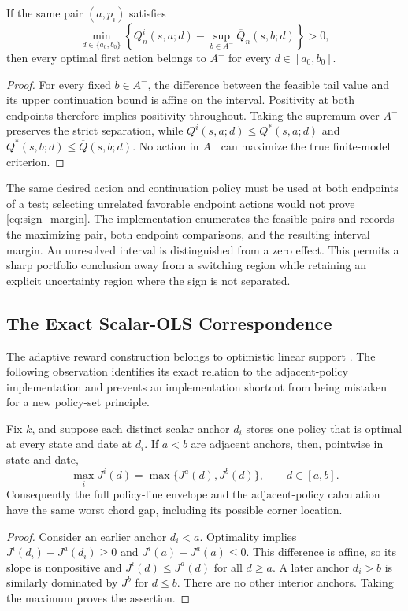 \begin{proposition}
\label{thm:sign}
If the same pair $(a,p_i)$ satisfies
\begin{equation}
 \min_{d\in\{a_0,b_0\}}
 \left\{Q^i_n(s,a;d)-\sup_{b\in A^-}\overline Q_n(s,b;d)\right\}>0,
 \label{eq:sign_margin}
\end{equation}
then every optimal first action belongs to $A^+$ for every $d\in[a_0,b_0]$.
\end{proposition}

\begin{proof}
For every fixed $b\in A^-$, the difference between the feasible tail value and its upper continuation bound is affine on the interval. Positivity at both endpoints therefore implies positivity throughout. Taking the supremum over $A^-$ preserves the strict separation, while $Q^i(s,a;d)\leq Q^*(s,a;d)$ and $Q^*(s,b;d)\leq\overline Q(s,b;d)$. No action in $A^-$ can maximize the true finite-model criterion.
\end{proof}

The same desired action and continuation policy must be used at both endpoints of a test; selecting unrelated favorable endpoint actions would not prove \eqref{eq:sign_margin}. The implementation enumerates the feasible pairs and records the maximizing pair, both endpoint comparisons, and the resulting interval margin. An unresolved interval is distinguished from a zero effect. This permits a sharp portfolio conclusion away from a switching region while retaining an explicit uncertainty region where the sign is not separated.

\subsection{The Exact Scalar-OLS Correspondence}
\label{sec:ols_correspondence}
The adaptive reward construction belongs to optimistic linear support \citep{alegre2022}. The following observation identifies its exact relation to the adjacent-policy implementation and prevents an implementation shortcut from being mistaken for a new policy-set principle.

\begin{proposition}
\label{prop:ols_equivalence}
Fix $k$, and suppose each distinct scalar anchor $d_i$ stores one policy that is optimal at every state and date at $d_i$. If $a<b$ are adjacent anchors, then, pointwise in state and date,
\[
 \max_iJ^i(d)=\max\{J^a(d),J^b(d)\},\qquad d\in[a,b].
\]
Consequently the full policy-line envelope and the adjacent-policy calculation have the same worst chord gap, including its possible corner location.
\end{proposition}
\begin{proof}
Consider an earlier anchor $d_i<a$. Optimality implies
$J^i(d_i)-J^a(d_i)\geq0$ and $J^i(a)-J^a(a)\leq0$.
This difference is affine, so its slope is nonpositive and $J^i(d)\leq J^a(d)$ for all $d\geq a$.
A later anchor $d_i>b$ is similarly dominated by $J^b$ for $d\leq b$.
There are no other interior anchors. Taking the maximum proves the assertion.
\end{proof}

